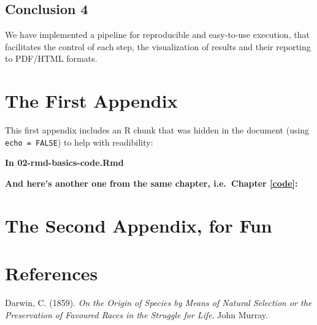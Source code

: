 \documentclass[a4paper, nobind]{templates/ociamthesis}
\newlength{\cslhangindent}
\newenvironment{CSLReferences}[2] %
 {%
  \setlength{\parindent}{0pt}
  \ifodd #1
  \let\oldpar\par
  \def\par{\hangindent=\cslhangindent\oldpar}
  \fi
  \setlength{\parskip}{1mm}
  \setlength{\baselineskip}{6mm}
 }%
 {}
\begin{document}
\hypertarget{conclusion-4}{%
\section*{Conclusion 4}\label{conclusion-4}}

We have implemented a pipeline for reproducible and easy-to-use execution, that facilitates the control of each step, the visualization of results and their reporting to PDF/HTML formats.

\startappendices

\hypertarget{the-first-appendix}{%
\chapter{The First Appendix}\label{the-first-appendix}}

This first appendix includes an R chunk that was hidden in the document (using \texttt{echo\ =\ FALSE}) to help with readibility:

\textbf{In 02-rmd-basics-code.Rmd}

\textbf{And here's another one from the same chapter, i.e.~Chapter \ref{code}:}

\hypertarget{the-second-appendix-for-fun}{%
\chapter{The Second Appendix, for Fun}\label{the-second-appendix-for-fun}}

\hypertarget{references}{%
\chapter*{References}\label{references}}


\hypertarget{refs}{}
\begin{CSLReferences}{1}{0}
\leavevmode{}%
Darwin, C. (1859). \emph{{On the Origin of Species by Means of Natural Selection or the Preservation of Favoured Races in the Struggle for Life}}. John Murray.

\end{CSLReferences}

\end{document}
